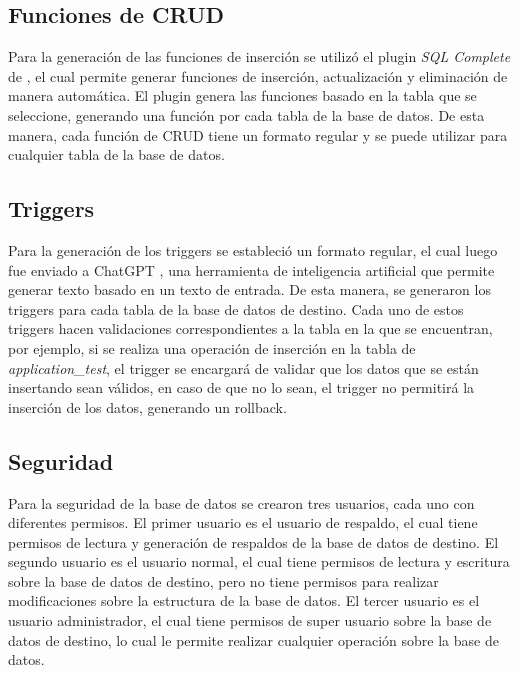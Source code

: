 \subsection{Funciones de CRUD}

Para la generación de las funciones de inserción se utilizó el plugin 
\textit{SQL Complete} de \cite{Devart}, el cual permite generar funciones de inserción,
actualización y eliminación de manera automática. El plugin genera las
funciones basado en la tabla que se seleccione, generando una función por cada 
tabla de la base de datos. De esta manera, cada función de CRUD tiene un 
formato regular y se puede utilizar para cualquier tabla de la base de datos.

\subsection{Triggers}

Para la generación de los triggers se estableció un formato regular, el cual 
luego fue enviado a ChatGPT \cite{OpenAI}, una herramienta de inteligencia artificial
que permite generar texto basado en un texto de entrada. De esta manera, se 
generaron los triggers para cada tabla de la base de datos de destino. Cada 
uno de estos triggers hacen validaciones correspondientes a la tabla en la que 
se encuentran, por ejemplo, si se realiza una operación de inserción en la 
tabla de \textit{application\_test}, el trigger se encargará de validar que 
los datos que se están insertando sean válidos, en caso de que no lo sean, 
el trigger no permitirá la inserción de los datos, generando un rollback.

\subsection{Seguridad}

Para la seguridad de la base de datos se crearon tres usuarios, cada uno con 
diferentes permisos. El primer usuario es el usuario de respaldo, el cual 
tiene permisos de lectura y generación de respaldos de la base de datos de
destino. El segundo usuario es el usuario normal, el cual tiene permisos de
lectura y escritura sobre la base de datos de destino, pero no tiene permisos
para realizar modificaciones sobre la estructura de la base de datos. El tercer
usuario es el usuario administrador, el cual tiene permisos de super usuario
sobre la base de datos de destino, lo cual le permite realizar cualquier
operación sobre la base de datos.

